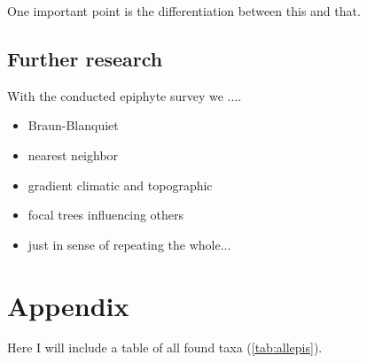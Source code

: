 \documentclass[12pt, a4paper, oneside, draft]{article}
\begin{document}
One important point is the differentiation between this and that.


	\subsection{Further research}
	With the conducted epiphyte survey we ....
		\begin{itemize}
		\item Braun-Blanquiet
		\item nearest neighbor
		\item gradient climatic and topographic
		\item focal trees influencing others
		\item just in sense of repeating the whole...
		\end{itemize}

\newpage
\printbibliography[title={References}]
\section{Appendix}
	\setcounter{table}{0}
	\renewcommand{\thetable}{A-\arabic{table}}
	Here I will include a table of all found taxa (\autoref{tab:allepis}).\\	
	
	
	
	

\listoftodos

\end{document}
